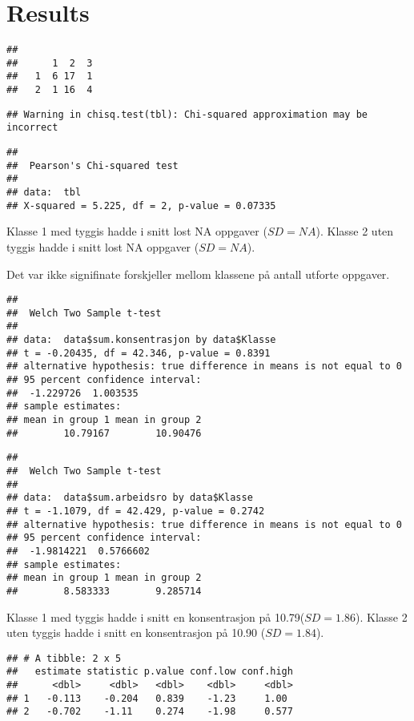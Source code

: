 \documentclass[english,man]{apa6}
\begin{document}
\hypertarget{results}{%
\section{Results}\label{results}}

\begin{verbatim}
##    
##      1  2  3
##   1  6 17  1
##   2  1 16  4
\end{verbatim}

\begin{verbatim}
## Warning in chisq.test(tbl): Chi-squared approximation may be incorrect
\end{verbatim}

\begin{verbatim}
## 
##  Pearson's Chi-squared test
## 
## data:  tbl
## X-squared = 5.225, df = 2, p-value = 0.07335
\end{verbatim}

Klasse 1 med tyggis hadde i snitt lost NA oppgaver (\(SD = NA\)). Klasse 2 uten tyggis hadde i snitt lost NA oppgaver (\(SD = NA\)).

Det var ikke signifinate forskjeller mellom klassene på antall utforte oppgaver.

\begin{verbatim}
## 
##  Welch Two Sample t-test
## 
## data:  data$sum.konsentrasjon by data$Klasse
## t = -0.20435, df = 42.346, p-value = 0.8391
## alternative hypothesis: true difference in means is not equal to 0
## 95 percent confidence interval:
##  -1.229726  1.003535
## sample estimates:
## mean in group 1 mean in group 2 
##        10.79167        10.90476
\end{verbatim}

\begin{verbatim}
## 
##  Welch Two Sample t-test
## 
## data:  data$sum.arbeidsro by data$Klasse
## t = -1.1079, df = 42.429, p-value = 0.2742
## alternative hypothesis: true difference in means is not equal to 0
## 95 percent confidence interval:
##  -1.9814221  0.5766602
## sample estimates:
## mean in group 1 mean in group 2 
##        8.583333        9.285714
\end{verbatim}

Klasse 1 med tyggis hadde i snitt en konsentrasjon på 10.79(\(SD = 1.86\)). Klasse 2 uten tyggis hadde i snitt en konsentrasjon på 10.90 (\(SD = 1.84\)).

\begin{verbatim}
## # A tibble: 2 x 5
##   estimate statistic p.value conf.low conf.high
##      <dbl>     <dbl>   <dbl>    <dbl>     <dbl>
## 1   -0.113    -0.204   0.839    -1.23     1.00 
## 2   -0.702    -1.11    0.274    -1.98     0.577
\end{verbatim}
\end{document}
